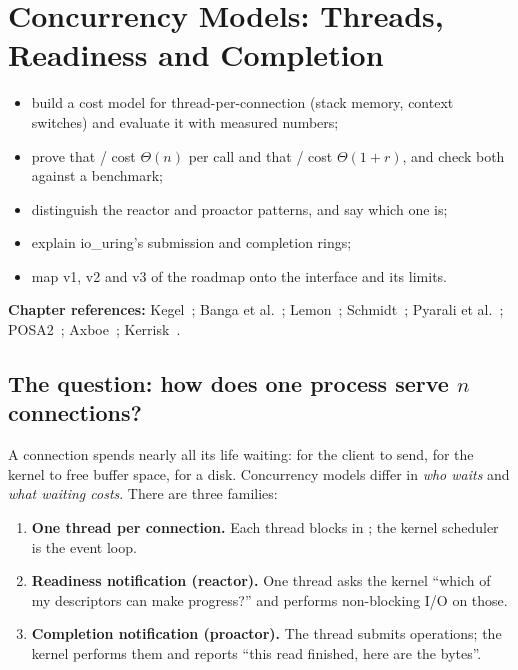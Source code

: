 \chapter{Concurrency Models: Threads, Readiness and Completion}\label{ch:conc}

\begin{objectives}
\begin{itemize}
\item build a cost model for thread-per-connection (stack memory, context switches) and evaluate it with measured numbers;
\item prove that / cost $\Theta(n)$ per call and that / cost $\Theta(1+r)$, and check both against a benchmark;
\item distinguish the reactor and proactor patterns, and say which one  is;
\item explain io\_uring's submission and completion rings;
\item map v1, v2 and v3 of the roadmap onto the  interface and its limits.
\end{itemize}
{\small\color{muted}\textbf{Chapter references:} Kegel~\cite{kegel1999c10k}; Banga et al.~\cite{banga1999scalable}; Lemon~\cite{lemon2001kqueue};
Schmidt~\cite{schmidt1995reactor}; Pyarali et al.~\cite{pyarali1997proactor}; POSA2~\cite{schmidt2000posa2};
Axboe~\cite{axboe2019iouring}; Kerrisk~\cite{kerrisk2010tlpi}.}
\end{objectives}

\section{The question: how does one process serve \texorpdfstring{$n$}{n} connections?}
A connection spends nearly all its life waiting: for the client to send, for the kernel to free buffer space, for a
disk. Concurrency models differ in \emph{who waits} and \emph{what waiting costs}. There are three families:
\begin{enumerate}[label=\textbf{\color{yel}(\roman*)}]
\item \textbf{One thread per connection.} Each thread blocks in ; the kernel scheduler is the event loop.
\item \textbf{Readiness notification (reactor).} One thread asks the kernel ``which of my descriptors can make progress?'' and performs non-blocking I/O on those.
\item \textbf{Completion notification (proactor).} The thread submits operations; the kernel performs them and reports ``this read finished, here are the bytes''.
\end{enumerate}

